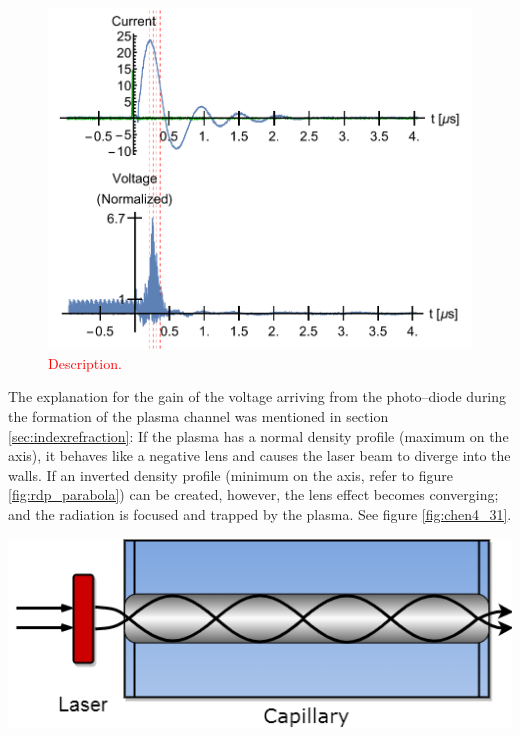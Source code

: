 \documentclass[../main.tex]{subfiles}
\begin{document}
\begin{figure}
    \centering
    \includegraphics[width=\textwidth]{figures/oscillator/guiding2.pdf}
    \caption{\textcolor{red}{Description.}}
    \label{fig:guiding2}
\end{figure}

The explanation for the gain of the voltage arriving from the photo--diode during the formation of the plasma channel was mentioned in section \ref{sec:indexrefraction}: If the plasma has a normal density profile (maximum on the axis), it behaves like a negative lens and causes the laser beam to diverge into the walls. If an inverted density profile (minimum on the axis, refer to figure \ref{fig:rdp_parabola}) can be created, however, the lens effect becomes converging; and the radiation is focused and trapped by the plasma. See figure \ref{fig:chen4_31}.
\begin{marginfigure}
\includegraphics[width=\marginparwidth]{figures/chen4_31.png}
\caption{A plasma confined inside the capillary will trap the \SI{800}{\nm} laser light only if the plasma has a density minimum on axis.}
\label{fig:chen4_31}
\end{marginfigure}
\end{document}
